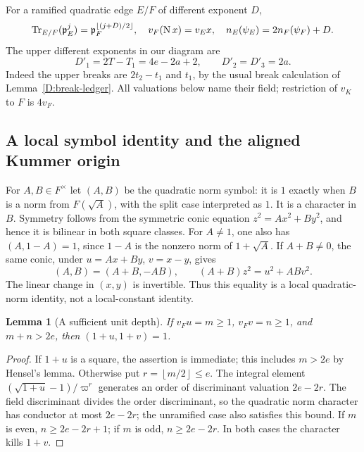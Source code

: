 \documentclass[11pt]{amsart}
\newtheorem{lemma}[theorem]{Lemma}
\theoremstyle{definition}
\theoremstyle{remark}
\newcommand{\Tr}{\operatorname{Tr}}
\newcommand{\Nm}{\operatorname{N}}
\newcommand{\floor}[1]{\left\lfloor #1\right\rfloor}
\begin{document}
For a ramified quadratic edge $E/F$ of different exponent $D$,
\begin{equation}\label{D:MX:trace}
 \Tr_{E/F}(\pp_E^j)=\pp_F^{\floor{(j+D)/2}},\quad
 v_F(\Nm x)=v_E x,\quad n_E(\psi_E)=2n_F(\psi_F)+D.
\end{equation}
The upper different exponents in our diagram are
\begin{equation}\label{D:MX:upper}
 D'_1=2T-T_1=4e-2a+2,\qquad D'_2=D'_3=2a.
\end{equation}
Indeed the upper breaks are $2t_2-t_1$ and $t_1$, by the usual
break calculation of Lemma~\ref{D:break-ledger}.
All valuations below name their field;
restriction of $v_K$ to $F$ is $4v_F$.

\subsection{A local symbol identity and the aligned Kummer origin}
For $A,B\in F^\times$ let $(A,B)$ be the quadratic norm symbol: it is
$1$ exactly when $B$ is a norm from $F(\sqrt A)$, with the split case
interpreted as $1$. It is a character in $B$. Symmetry follows from the
symmetric conic equation $z^2=A x^2+B y^2$, and hence it is bilinear in
both square classes. For $A\ne1$, one also has $(A,1-A)=1$, since
$1-A$ is the nonzero norm of $1+\sqrt A$. If $A+B\ne0$, the same conic, under
$u=Ax+By$, $v=x-y$, gives
\begin{equation}\label{D:MX:symbol-transform}
 (A,B)=(A+B,-AB),\qquad
 (A+B)z^2=u^2+ABv^2.
\end{equation}
The linear change in $(x,y)$ is invertible. Thus this equality is a
local quadratic-norm identity, not a local-constant identity.

\begin{lemma}[A sufficient unit depth]\label{D:MX:unit-symbol}
If $v_Fu=m\ge1$, $v_Fv=n\ge1$, and $m+n>2e$, then
$(1+u,1+v)=1$.
\end{lemma}
\begin{proof}
If $1+u$ is a square, the assertion is immediate; this includes
$m>2e$ by Hensel's lemma. Otherwise put
$r=\floor{m/2}\le e$. The integral element
$(\sqrt{1+u}-1)/\varpi^r$ generates an order of discriminant valuation
$2e-2r$. The field discriminant divides the order discriminant, so the
quadratic norm character has conductor at most $2e-2r$; the unramified
case also satisfies this bound. If $m$ is even, $n\ge2e-2r+1$;
if $m$ is odd, $n\ge2e-2r$. In both cases the character kills $1+v$.
\end{proof}
\end{document}
